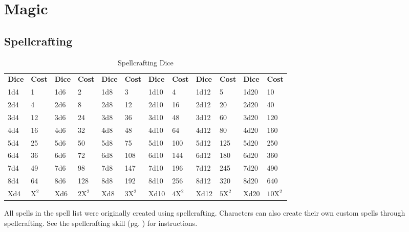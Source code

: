 \chapter{Magic}\label{magic}

\begin{multicols*}{2}
    \section{Spellcrafting}
    \begin{table*}[ht]
        \unclassedrowcolors
        \begin{tabularx}{\textwidth}{l X l X l X l X l X l X}
            \textbf{Dice} & \textbf{Cost} & \textbf{Dice} & \textbf{Cost} & \textbf{Dice} & \textbf{Cost} & \textbf{Dice} & \textbf{Cost} & \textbf{Dice} & \textbf{Cost} & \textbf{Dice} & \textbf{Cost} \\
            1d4 & 1   & 1d6 & 2    & 1d8 & 3    & 1d10 & 4    & 1d12 & 5    & 1d20 & 10    \\
            2d4 & 4   & 2d6 & 8    & 2d8 & 12   & 2d10 & 16   & 2d12 & 20   & 2d20 & 40    \\
            3d4 & 12  & 3d6 & 24   & 3d8 & 36   & 3d10 & 48   & 3d12 & 60   & 3d20 & 120   \\
            4d4 & 16  & 4d6 & 32   & 4d8 & 48   & 4d10 & 64   & 4d12 & 80   & 4d20 & 160   \\
            5d4 & 25  & 5d6 & 50   & 5d8 & 75   & 5d10 & 100  & 5d12 & 125  & 5d20 & 250   \\
            6d4 & 36  & 6d6 & 72   & 6d8 & 108  & 6d10 & 144  & 6d12 & 180  & 6d20 & 360   \\
            7d4 & 49  & 7d6 & 98   & 7d8 & 147  & 7d10 & 196  & 7d12 & 245  & 7d20 & 490   \\
            8d4 & 64  & 8d6 & 128  & 8d8 & 192  & 8d10 & 256  & 8d12 & 320  & 8d20 & 640   \\
            Xd4 & $\text{X}^\text{2}$ & Xd6 & $\text{2X}^\text{2}$ & Xd8 & $\text{3X}^\text{2}$ & Xd10 & $\text{4X}^\text{2}$ & Xd12 & $\text{5X}^\text{2}$ & Xd20 & $\text{10X}^\text{2}$ \\
        \end{tabularx}
        \caption{Spellcrafting Dice}
        \label{tab:spellcrafting-dice}
    \end{table*}

    All spells in the spell list were originally created using spellcrafting.
    Characters can also create their own custom spells through spellcrafting.
    See the spellcrafting skill (pg. \pageref{skill:spellcrafting}) for
    instructions.


\end{multicols*}
